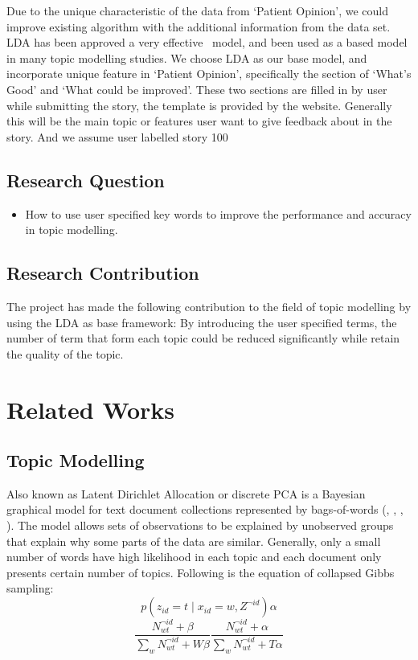 \documentclass[11pt,twoside]{report}
\begin{document}
Due to the unique characteristic of the data from ‘Patient Opinion’, we could improve existing algorithm with the additional information from the data set. LDA has been approved a very effective  model, and been used as a based model in many topic modelling studies. We choose LDA as our base model, and incorporate unique feature in ‘Patient Opinion’, specifically the section of ‘What’s Good’ and ‘What could be improved’. These two sections are filled in by user while submitting the story, the template is provided by the website. Generally this will be the main topic or features user want to give feedback about in the story. And we assume user labelled story 100%
\section{Research Question}
\begin{itemize}
\item How to use user specified key words to improve the performance and accuracy in topic modelling.
\end{itemize}

\section{Research Contribution}
The project has made the following contribution to the field of topic modelling by using the LDA as base framework:
By introducing the user specified terms, the number of term that form each topic could be reduced significantly while retain the quality of the topic.

\chapter{Related Works}

\section{Topic Modelling}
Also known as Latent Dirichlet Allocation or discrete PCA is a Bayesian graphical model for text document collections represented by bags-of-words (\cite{ref26}, \cite{ref25}, \cite{ref30}, \cite{ref31}). The model allows sets of observations to be explained by unobserved groups that explain why some parts of the data are similar. Generally, only a small number of words have high likelihood in each topic and each document only presents certain number of topics. Following is the equation of collapsed Gibbs sampling:
\begin{equation}
p(z_{id}=t\mid x_{id}=w,Z^{\neg id}) \alpha
\end{equation}
\begin{equation}
\frac{N_{wt}^{\neg id} + \beta}{\sum_{w}N_{wt}^{\neg id} + W\beta} \frac{N_{wt}^{\neg id} + \alpha}{\sum_{w}N_{wt}^{\neg id} + T\alpha}
\end{equation}
\end{document}

